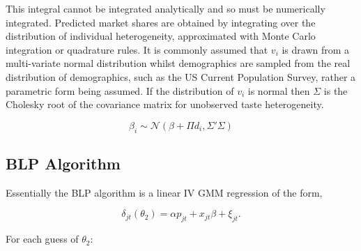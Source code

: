 \documentclass[parskip=half]{scrartcl}
\begin{document}
This integral cannot be integrated analytically and so must be numerically integrated. Predicted market shares are obtained by integrating over the distribution of individual heterogeneity, approximated with Monte Carlo integration or quadrature rules. It is commonly assumed that \(v_i\) is drawn from a multi-variate normal distribution whilst demographics are sampled from the real distribution of demographics, such as the US Current Population Survey, rather a parametric form being assumed. If the distribution of \(v_i\) is normal then \(\Sigma\) is the Cholesky root of the covariance matrix for unobserved taste heterogeneity.

\begin{equation}
\beta_i \sim \mathcal{N}(\beta + \Pi d_i, \Sigma'\Sigma)
\end{equation}

\subsection{BLP Algorithm}

Essentially the BLP algorithm is a linear IV GMM regression of the form,

\begin{equation}
\delta_{jt}(\theta_2) = \alpha p_{jt} + x_{jt} \beta + \xi_{jt}.
\end{equation}

For each guess of \(\theta_2\):
\end{document}
